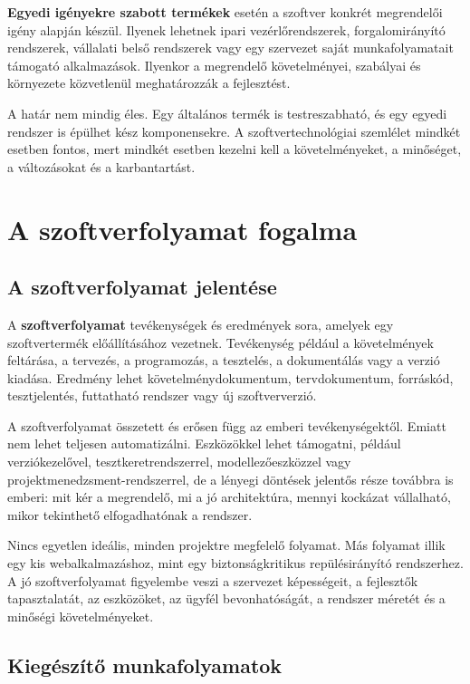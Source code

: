\textbf{Egyedi igényekre szabott termékek} esetén a szoftver konkrét megrendelői igény alapján készül. Ilyenek lehetnek ipari vezérlőrendszerek, forgalomirányító rendszerek, vállalati belső rendszerek vagy egy szervezet saját munkafolyamatait támogató alkalmazások. Ilyenkor a megrendelő követelményei, szabályai és környezete közvetlenül meghatározzák a fejlesztést.

A határ nem mindig éles. Egy általános termék is testreszabható, és egy egyedi rendszer is épülhet kész komponensekre. A szoftvertechnológiai szemlélet mindkét esetben fontos, mert mindkét esetben kezelni kell a követelményeket, a minőséget, a változásokat és a karbantartást.

\section{A szoftverfolyamat fogalma}

\subsection{A szoftverfolyamat jelentése}

A \textbf{szoftverfolyamat} tevékenységek és eredmények sora, amelyek egy szoftvertermék előállításához vezetnek. Tevékenység például a követelmények feltárása, a tervezés, a programozás, a tesztelés, a dokumentálás vagy a verzió kiadása. Eredmény lehet követelménydokumentum, tervdokumentum, forráskód, tesztjelentés, futtatható rendszer vagy új szoftververzió.

A szoftverfolyamat összetett és erősen függ az emberi tevékenységektől. Emiatt nem lehet teljesen automatizálni. Eszközökkel lehet támogatni, például verziókezelővel, tesztkeretrendszerrel, modellezőeszközzel vagy projektmenedzsment-rendszerrel, de a lényegi döntések jelentős része továbbra is emberi: mit kér a megrendelő, mi a jó architektúra, mennyi kockázat vállalható, mikor tekinthető elfogadhatónak a rendszer.

Nincs egyetlen ideális, minden projektre megfelelő folyamat. Más folyamat illik egy kis webalkalmazáshoz, mint egy biztonságkritikus repülésirányító rendszerhez. A jó szoftverfolyamat figyelembe veszi a szervezet képességeit, a fejlesztők tapasztalatát, az eszközöket, az ügyfél bevonhatóságát, a rendszer méretét és a minőségi követelményeket.

\subsection{Kiegészítő munkafolyamatok}


